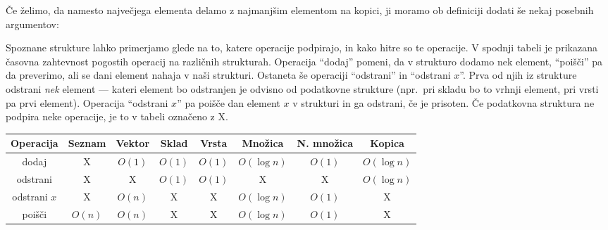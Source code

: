 
Če želimo, da namesto največjega elementa delamo z najmanjšim elementom na
kopici, ji moramo ob definiciji dodati še nekaj posebnih argumentov:



Spoznane strukture lahko primerjamo glede na to, katere operacije podpirajo, in
kako hitre so te operacije.
V spodnji tabeli je prikazana časovna zahtevnost pogostih operacij na različnih
strukturah.
Operacija \enquote{dodaj} pomeni, da v strukturo dodamo nek element,
\enquote{poišči} pa da preverimo, ali se dani element nahaja v naši strukturi.
Ostaneta še operaciji \enquote{odstrani} in \enquote{odstrani $x$}.
Prva od njih iz strukture odstrani \emph{nek} element --- kateri element bo
odstranjen je odvisno od podatkovne strukture (npr.~pri skladu bo to vrhnji
element, pri vrsti pa prvi element).
Operacija \enquote{odstrani $x$} pa poišče dan element $x$ v strukturi in ga
odstrani, če je prisoten.
Če podatkovna struktura ne podpira neke operacije, je to v tabeli označeno z X.

\begin{table*}[h!]
  \centering
  \begin{tabular}{c|ccccccc}
	Operacija & Seznam & Vektor & Sklad & Vrsta & Množica & N. množica & Kopica \\
	\hline
	dodaj & X & $O(1)$ & $O(1)$ & $O(1)$ & $O(\log n)$ & $O(1)$ & $O(\log n)$ \\
	odstrani & X & X & $O(1)$ & $O(1)$ & X & X & $O(\log n)$ \\
	odstrani $x$ & X & $O(n)$ & X & X & $O(\log n)$ & $O(1)$ & X \\
	poišči & $O(n)$ & $O(n)$ & X & X & $O(\log n)$ & $O(1)$ & X \\
  \end{tabular}
\end{table*}

